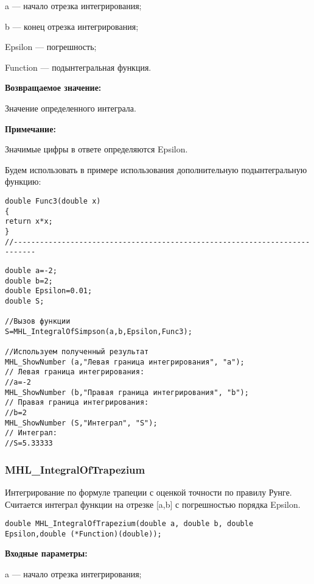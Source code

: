 \documentclass[a4paper,12pt]{article}
\begin{document}
 a --- начало отрезка интегрирования;
 
 b --- конец отрезка интегрирования;
 
 Epsilon --- погрешность;
 
 Function --- подынтегральная функция.

\textbf{Возвращаемое значение:}
 
 Значение определенного интеграла.
 
 \textbf{Примечание:}
 
 Значимые цифры в ответе определяются Epsilon.

Будем использовать в примере использования дополнительную подынтегральную функцию:

\begin{lstlisting}[caption=Дополнительная функция]
double Func3(double x)
{
return x*x;
}
//---------------------------------------------------------------------------
\end{lstlisting}


\begin{lstlisting}[label=code_use_MHL_IntegralOfSimpson,caption=Пример использования]
double a=-2;
double b=2;
double Epsilon=0.01;
double S;

//Вызов функции
S=MHL_IntegralOfSimpson(a,b,Epsilon,Func3);

//Используем полученный результат
MHL_ShowNumber (a,"Левая граница интегрирования", "a");
// Левая граница интегрирования:
//a=-2
MHL_ShowNumber (b,"Правая граница интегрирования", "b");
// Правая граница интегрирования:
//b=2
MHL_ShowNumber (S,"Интеграл", "S");
// Интеграл:
//S=5.33333
\end{lstlisting}

\subsubsection{MHL\_IntegralOfTrapezium}\label{MHL_IntegralOfTrapezium}

Интегрирование по формуле трапеции с оценкой точности по правилу Рунге. Считается интеграл функции на отрезке [a,b] с погрешностью порядка Epsilon.


\begin{lstlisting}[label=code_syntax_MHL_IntegralOfTrapezium,caption=Синтаксис]
double MHL_IntegralOfTrapezium(double a, double b, double Epsilon,double (*Function)(double));
\end{lstlisting}

\textbf{Входные параметры:}

 a --- начало отрезка интегрирования;
 
\end{document}
